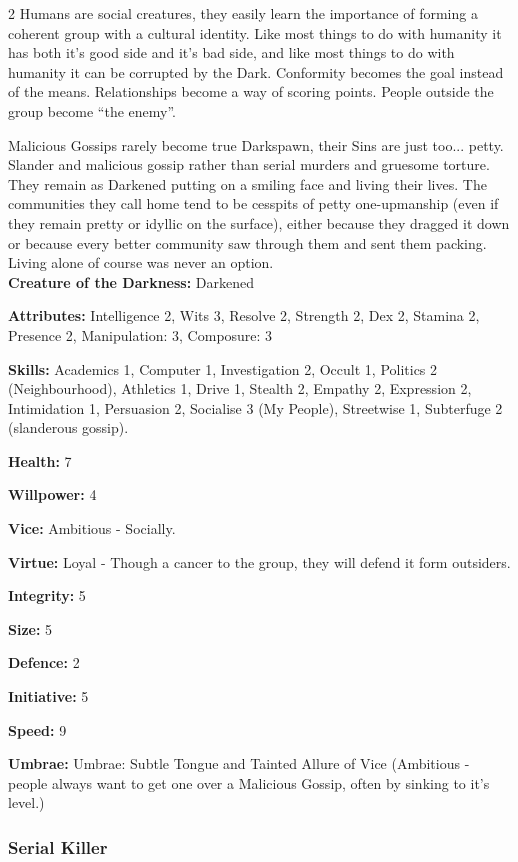 \begin{multicols}{2}
Humans are social creatures, they easily learn the importance of forming a coherent group with a cultural identity. Like most things to do with humanity it has both it's good side and it's bad side, and like most things to do with humanity it can be corrupted by the Dark. Conformity becomes the goal instead of the means. Relationships become a way of scoring points. People outside the group become “the enemy”.

Malicious Gossips rarely become true Darkspawn, their Sins are just too... petty. Slander and malicious gossip rather than serial murders and gruesome torture. They remain as Darkened putting on a smiling face and living their lives. The communities they call home tend to be cesspits of petty one-upmanship (even if they remain pretty or idyllic on the surface), either because they dragged it down or because every better community saw through them and sent them packing. Living alone of course was never an option.\\

\noindent \textbf{Creature of the Darkness:} Darkened

\noindent \textbf{Attributes:} Intelligence 2, Wits 3, Resolve 2, Strength 2, Dex 2, Stamina 2, Presence 2, Manipulation: 3, Composure: 3

\noindent \textbf{Skills:} Academics 1, Computer 1, Investigation 2, Occult 1, Politics 2 (Neighbourhood), Athletics 1, Drive 1, Stealth 2, Empathy 2, Expression 2, Intimidation 1, Persuasion 2, Socialise 3 (My People), Streetwise 1, Subterfuge 2 (slanderous gossip).

\noindent \textbf{Health:} 7

\noindent \textbf{Willpower:} 4

\noindent \textbf{Vice:} Ambitious - Socially.

\noindent \textbf{Virtue:} Loyal - Though a cancer to the group, they will defend it form outsiders.

\noindent \textbf{Integrity:} 5

\noindent \textbf{Size:} 5

\noindent \textbf{Defence:} 2

\noindent \textbf{Initiative:} 5

\noindent \textbf{Speed:} 9

\noindent \textbf{Umbrae:} Umbrae: Subtle Tongue and Tainted Allure of Vice (Ambitious - people always want to get one over a Malicious Gossip, often by sinking to it's level.) 

\subsubsection*{Serial Killer}


\end{multicols}
